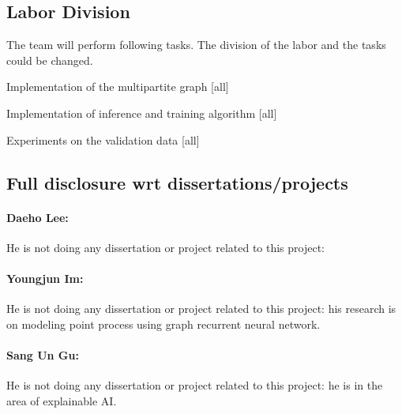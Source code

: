 \subsection{Labor Division}

The team will perform following tasks. The division of the labor and the tasks could be changed.
\bit
\item Implementation of the multipartite graph [all]
\item Implementation of inference and training algorithm [all]
\item Experiments on the validation data [all]
\eit

\subsection{Full disclosure wrt dissertations/projects}

\paragraph{Daeho Lee:}
He is not doing any dissertation or project related to this project: 

\paragraph{Youngjun Im:}
He is not doing any dissertation or project related to this project: his research is on modeling point process using graph recurrent neural network.

\paragraph{Sang Un Gu:}
He is not doing any dissertation or project related to this project: he is in the area of explainable AI.
